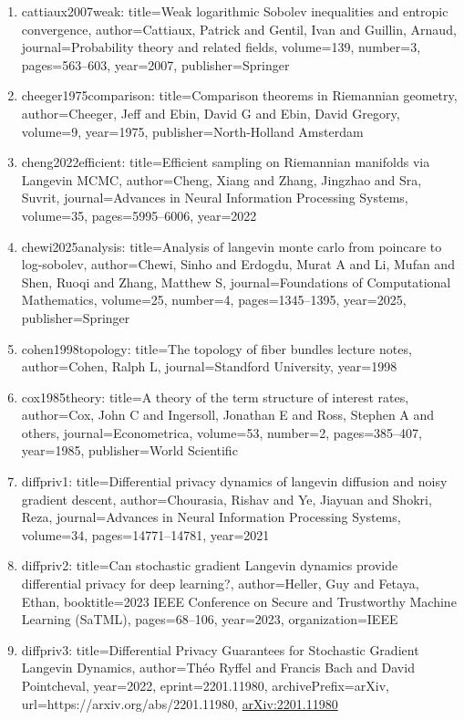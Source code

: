 \documentclass[11pt]{article}
\begin{document}
\begin{enumerate}[leftmargin=*]
  \item cattiaux2007weak: title=Weak logarithmic Sobolev inequalities and entropic convergence, author=Cattiaux, Patrick and Gentil, Ivan and Guillin, Arnaud, journal=Probability theory and related fields, volume=139, number=3, pages=563--603, year=2007, publisher=Springer
  \item cheeger1975comparison: title=Comparison theorems in Riemannian geometry, author=Cheeger, Jeff and Ebin, David G and Ebin, David Gregory, volume=9, year=1975, publisher=North-Holland Amsterdam
  \item cheng2022efficient: title=Efficient sampling on Riemannian manifolds via Langevin MCMC, author=Cheng, Xiang and Zhang, Jingzhao and Sra, Suvrit, journal=Advances in Neural Information Processing Systems, volume=35, pages=5995--6006, year=2022
  \item chewi2025analysis: title=Analysis of langevin monte carlo from poincare to log-sobolev, author=Chewi, Sinho and Erdogdu, Murat A and Li, Mufan and Shen, Ruoqi and Zhang, Matthew S, journal=Foundations of Computational Mathematics, volume=25, number=4, pages=1345--1395, year=2025, publisher=Springer
  \item cohen1998topology: title=The topology of fiber bundles lecture notes, author=Cohen, Ralph L, journal=Standford University, year=1998
  \item cox1985theory: title=A theory of the term structure of interest rates, author=Cox, John C and Ingersoll, Jonathan E and Ross, Stephen A and others, journal=Econometrica, volume=53, number=2, pages=385--407, year=1985, publisher=World Scientific
  \item diffpriv1: title=Differential privacy dynamics of langevin diffusion and noisy gradient descent, author=Chourasia, Rishav and Ye, Jiayuan and Shokri, Reza, journal=Advances in Neural Information Processing Systems, volume=34, pages=14771--14781, year=2021
  \item diffpriv2: title=Can stochastic gradient Langevin dynamics provide differential privacy for deep learning?, author=Heller, Guy and Fetaya, Ethan, booktitle=2023 IEEE Conference on Secure and Trustworthy Machine Learning (SaTML), pages=68--106, year=2023, organization=IEEE
  \item diffpriv3: title=Differential Privacy Guarantees for Stochastic Gradient Langevin Dynamics, author=Théo Ryffel and Francis Bach and David Pointcheval, year=2022, eprint=2201.11980, archivePrefix=arXiv, url=https://arxiv.org/abs/2201.11980, \href{https://arxiv.org/abs/2201.11980}{arXiv:2201.11980}

\end{enumerate}
\end{document}
